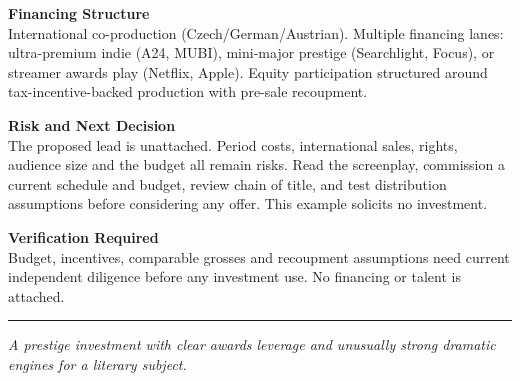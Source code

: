 \documentclass[11pt,letterpaper]{article}
\begin{document}
\vspace{2pt}
\textbf{Financing Structure}\\
International co-production (Czech/German/Austrian). Multiple financing lanes: ultra-premium indie (A24, MUBI), mini-major prestige (Searchlight, Focus), or streamer awards play (Netflix, Apple). Equity participation structured around tax-incentive-backed production with pre-sale recoupment.

\vspace{2pt}

\textbf{Risk and Next Decision}\\
The proposed lead is unattached. Period costs, international sales, rights, audience size and the budget all remain risks. Read the screenplay, commission a current schedule and budget, review chain of title, and test distribution assumptions before considering any offer. This example solicits no investment.

\vspace{2pt}
\textbf{Verification Required}\\
Budget, incentives, comparable grosses and recoupment assumptions need current independent diligence before any investment use. No financing or talent is attached.

\vspace{4pt}
\textcolor{sectionrule}{\rule{\textwidth}{0.5pt}}
\vspace{2pt}
\begin{center}
{\small\color{kafkalight}\textit{A prestige investment with clear awards leverage and unusually strong dramatic engines for a literary subject.}}
\end{center}
\end{document}
